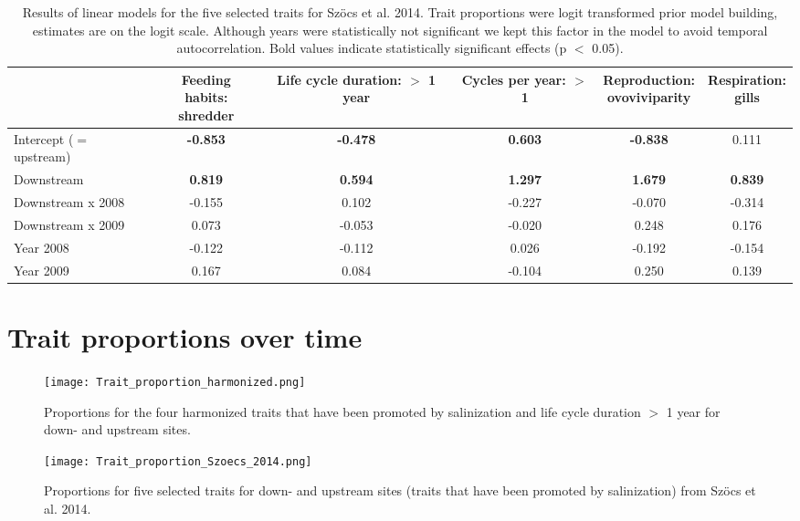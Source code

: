 \documentclass[../Draft_harmonization_paper.tex]{subfiles}
\begin{document}
\begin{table}[ht]
    \centering
    \caption{Results of linear models for the five selected traits for Szöcs et al. 2014. Trait proportions were logit transformed prior model building, estimates are on the logit scale.
    Although years were statistically not significant we kept this factor in the model to avoid temporal autocorrelation. Bold values indicate statistically
    significant effects (p $<$ 0.05).}
    \begin{tabular}{lccccc}
    \hline
    & \specialcell{Feeding habits:\\ shredder} & \specialcell{Life cycle duration:\\ $>$ 1 year} & \specialcell {Cycles per year:\\ $>$ 1} & \specialcell{Reproduction:\\ ovoviviparity} & \specialcell{Respiration:\\ gills} \\ 
    \hline
    Intercept ($=$ upstream) & \textbf{-0.853} & \textbf{-0.478} & \textbf{0.603} & \textbf{-0.838} & 0.111 \\ 
    Downstream & \textbf{0.819} & \textbf{0.594} & \textbf{1.297} & \textbf{1.679} & \textbf{0.839} \\ 
    Downstream x 2008 & -0.155 & 0.102 & -0.227 & -0.070 & -0.314 \\ 
    Downstream x 2009 & 0.073 & -0.053 & -0.020 & 0.248 & 0.176 \\ 
    Year 2008 & -0.122 & -0.112 & 0.026 & -0.192 & -0.154 \\ 
    Year 2009 & 0.167 & 0.084 & -0.104 & 0.250 & 0.139 \\ 
    \hline
    \end{tabular} 
\end{table}


\section*{Trait proportions over time}
\begin{figure}[H]
    \centering
    \texttt{[image: Trait\_proportion\_harmonized.png]}
    \caption{Proportions for the four harmonized traits that have been promoted by salinization and life cycle duration $>$ 1 year for down- and upstream sites.
    } 
\end{figure}

\begin{figure}[H]
    \centering
    \texttt{[image: Trait\_proportion\_Szoecs\_2014.png]}
    \caption{Proportions for five selected traits for down- and upstream sites (traits that have been promoted by salinization) from Szöcs et al. 2014.} 
\end{figure}
\end{document}
